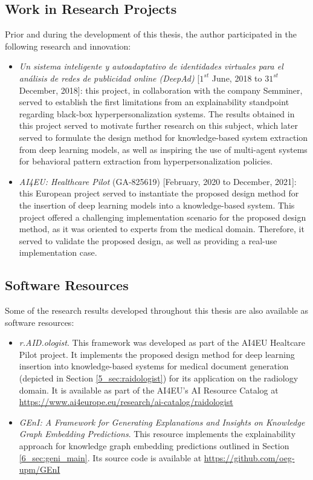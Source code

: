 \subsection{Work in Research Projects}
Prior and during the development of this thesis, the author participated in the following research and innovation:
\begin{itemize}
    \item \textit{Un sistema inteligente y autoadaptativo de identidades virtuales para el análisis de redes de publicidad online (DeepAd)} [$1^{st}$ June, 2018 to $31^{st}$ December, 2018]: this project, in collaboration with the company Semminer, served to establish the first limitations from an explainability standpoint regarding black-box hyperpersonalization systems. The results obtained in this project served to motivate further research on this subject, which later served to formulate the design method for knowledge-based system extraction from deep learning models, as well as inspiring the use of multi-agent systems for behavioral pattern extraction from hyperpersonalization policies.
    
    \item \textit{AI4EU: Healthcare Pilot} (GA-825619) [February, 2020 to December, 2021]: this European project served to instantiate the proposed design method for the insertion of deep learning models into a knowledge-based system. This project offered a challenging implementation scenario for the proposed design method, as it was oriented to experts from the medical domain. Therefore, it served to validate the proposed design, as well as providing a real-use implementation case.
\end{itemize}
\subsection{Software Resources}
Some of the research results developed throughout this thesis are also available as software resources:
\begin{itemize}
    \item \textit{r.AID.ologist}. This framework was developed as part of the AI4EU Healtcare Pilot project. It implements the proposed design method for deep learning insertion into knowledge-based systems for medical document generation (depicted in Section \ref{5_sec:raidologist}) for its application on the radiology domain. It is available as part of the AI4EU's AI Resource Catalog at \url{https://www.ai4europe.eu/research/ai-catalog/raidologist}
    
    \item \textit{GEnI: A Framework for Generating Explanations and Insights on Knowledge Graph Embedding Predictions}. This resource implements the explainability approach for knowledge graph embedding predictions outlined in Section \ref{6_sec:geni_main}. Its source code is available at \url{https://github.com/oeg-upm/GEnI}
\end{itemize}
